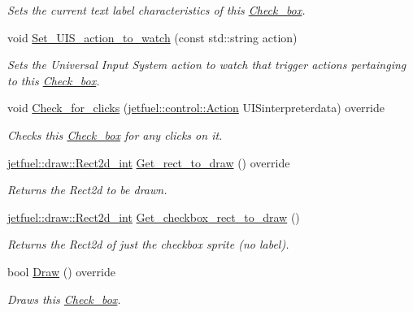 \begin{DoxyCompactItemize}
\begin{DoxyCompactList}\small\item\em Sets the current text label characteristics of this \hyperlink{classjetfuel_1_1gui_1_1Check__box}{Check\+\_\+box}. \end{DoxyCompactList}\item 
void \hyperlink{classjetfuel_1_1gui_1_1Check__box_a92a70756f7b7d37c3b40a08bc251ff8b}{Set\+\_\+\+U\+I\+S\+\_\+action\+\_\+to\+\_\+watch} (const std\+::string action)
\begin{DoxyCompactList}\small\item\em Sets the Universal Input System action to watch that trigger actions pertainging to this \hyperlink{classjetfuel_1_1gui_1_1Check__box}{Check\+\_\+box}. \end{DoxyCompactList}\item 
void \hyperlink{classjetfuel_1_1gui_1_1Check__box_a0e50420591dbd64f07f02f9ee7cec637}{Check\+\_\+for\+\_\+clicks} (\hyperlink{structjetfuel_1_1control_1_1Action}{jetfuel\+::control\+::\+Action} U\+I\+Sinterpreterdata) override
\begin{DoxyCompactList}\small\item\em Checks this \hyperlink{classjetfuel_1_1gui_1_1Check__box}{Check\+\_\+box} for any clicks on it. \end{DoxyCompactList}\item 
\hyperlink{classjetfuel_1_1draw_1_1Rect2d}{jetfuel\+::draw\+::\+Rect2d\+\_\+int} \hyperlink{classjetfuel_1_1gui_1_1Check__box_a09feae5781a788df462be6276e2d1c54}{Get\+\_\+rect\+\_\+to\+\_\+draw} () override
\begin{DoxyCompactList}\small\item\em Returns the Rect2d to be drawn. \end{DoxyCompactList}\item 
\hyperlink{classjetfuel_1_1draw_1_1Rect2d}{jetfuel\+::draw\+::\+Rect2d\+\_\+int} \hyperlink{classjetfuel_1_1gui_1_1Check__box_a83b3fc8469caf6c33e41fc1b4fe7295c}{Get\+\_\+checkbox\+\_\+rect\+\_\+to\+\_\+draw} ()
\begin{DoxyCompactList}\small\item\em Returns the Rect2d of just the checkbox sprite (no label). \end{DoxyCompactList}\item 
bool \hyperlink{classjetfuel_1_1gui_1_1Check__box_ad2ce6d4af8d950a4ef76b0688541c29a}{Draw} () override
\begin{DoxyCompactList}\small\item\em Draws this \hyperlink{classjetfuel_1_1gui_1_1Check__box}{Check\+\_\+box}. \end{DoxyCompactList}\end{DoxyCompactItemize}
